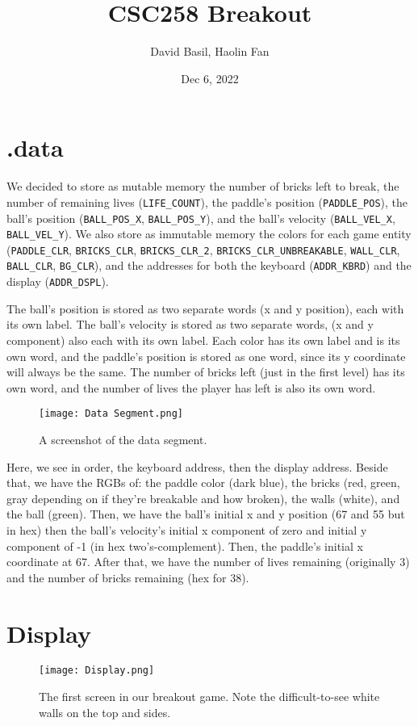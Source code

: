 \documentclass{article}
\title{CSC258 Breakout}
\author{David Basil, Haolin Fan}
\date{Dec 6, 2022}
\begin{document}
\maketitle

\section{.data}
We decided to store as mutable memory the number of bricks left to break, the number of remaining lives (\lstinline{LIFE_COUNT}), the paddle's position (\lstinline{PADDLE_POS}), the ball's position (\lstinline{BALL_POS_X}, \lstinline{BALL_POS_Y}), and the ball's velocity (\lstinline{BALL_VEL_X}, \lstinline{BALL_VEL_Y}). We also store as immutable memory the colors for each game entity (\lstinline{PADDLE_CLR}, \lstinline{BRICKS_CLR}, \lstinline{BRICKS_CLR_2}, \lstinline{BRICKS_CLR_UNBREAKABLE}, \lstinline{WALL_CLR}, \lstinline{BALL_CLR}, \lstinline{BG_CLR}), and the addresses for both the keyboard (\lstinline{ADDR_KBRD}) and the display (\lstinline{ADDR_DSPL}).

The ball's position is stored as two separate words (x and y position), each with its own label. The ball's velocity is stored as two separate words, (x and y component) also each with its own label. Each color has its own label and is its own word, and the paddle's position is stored as one word, since its y coordinate will always be the same. The number of bricks left (just in the first level) has its own word, and the number of lives the player has left is also its own word.

\begin{figure}[ht!]
    \centering
    \texttt{[image: Data Segment.png]}
    \caption{A screenshot of the data segment.}
\end{figure}
Here, we see in order, the keyboard address, then the display address. Beside that, we have the RGBs of: the paddle color (dark blue), the bricks (red, green, gray depending on if they're breakable and how broken), the walls (white), and the ball (green). Then, we have the ball's initial x and y position (67 and 55 but in hex) then the ball's velocity's initial x component of zero and initial y component of -1 (in hex two's-complement). Then, the paddle's initial x coordinate at 67. After that, we have the number of lives remaining (originally 3) and the number of bricks remaining (hex for 38).

\newpage 
\section{Display}
\begin{figure}[ht!]
    \centering
    \texttt{[image: Display.png]}
    \caption{The first screen in our breakout game. Note the difficult-to-see white walls on the top and sides.}
\end{figure}
\end{document}
